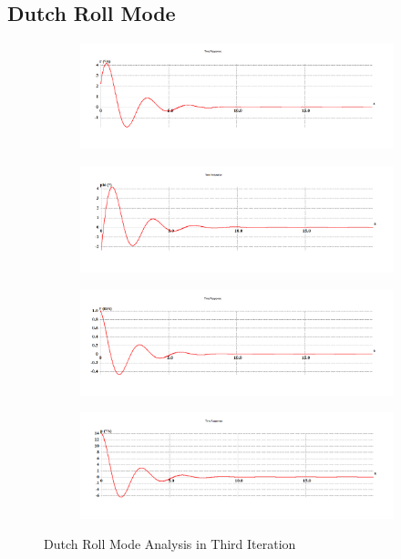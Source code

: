 \subsection{Dutch Roll Mode}
\begin{figure}[H]
\begin{subfigure}{0.48\textwidth}
\includegraphics[width = \linewidth]{r2.png}
\end{subfigure}
\begin{subfigure}{0.48\textwidth}
\includegraphics[width = \linewidth]{phi2.png}
\end{subfigure}
\medskip
\begin{subfigure}{0.48\textwidth}
\includegraphics[width = \linewidth]{v2.png}
\end{subfigure}
\begin{subfigure}{0.48\textwidth}
\includegraphics[width = \linewidth]{p2.png}
\end{subfigure}
\caption{Dutch Roll Mode Analysis in Third Iteration}
\end{figure}
